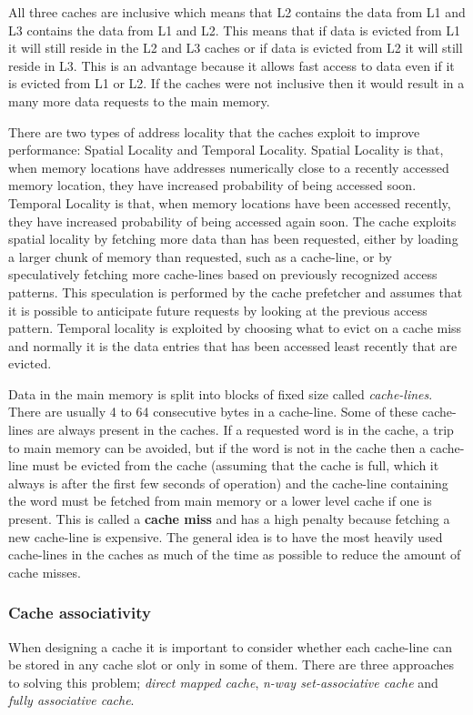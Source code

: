 All three caches are inclusive which means that L2 contains the data from L1 and L3 contains the data from L1 and L2.
This means that if data is evicted from L1 it will still reside in the L2 and L3 caches or if data is evicted from L2 it will still reside in L3. 
This is an advantage because it allows fast access to data even if it is evicted from L1 or L2. 
If the caches were not inclusive then it would result in a many more data requests to the main memory.

There are two types of address locality that the caches exploit to improve performance: Spatial Locality and Temporal Locality.
Spatial Locality is that, when memory locations have addresses numerically close to a recently accessed memory location, they have increased probability of being accessed soon.
Temporal Locality is that, when memory locations have been accessed recently, they have increased probability of being accessed again soon.
The cache exploits spatial locality by fetching more data than has been requested, either by loading a larger chunk of memory than requested, such as a cache-line, or by speculatively fetching more cache-lines based on previously recognized access patterns.  This speculation is performed by the cache prefetcher and assumes that it is possible to anticipate future requests by looking at the previous access pattern.
Temporal locality is exploited by choosing what to evict on a cache miss and normally it is the data entries that has been accessed least recently that are evicted.

Data in the main memory is split into blocks of fixed size called \textit{cache-lines}. 
There are usually 4 to 64 consecutive bytes in a cache-line. 
Some of these cache-lines are always present in the caches. 
If a requested word is in the cache, a trip to main memory can be avoided, but if the word is not in the cache then a cache-line must be evicted from the cache (assuming that the cache is full, which it always is after the first few seconds of operation) and the cache-line containing the word must be fetched from main memory or a lower level cache if one is present. 
This is called a \textbf{cache miss} and has a high penalty because fetching a new cache-line is expensive.
The general idea is to have the most heavily used cache-lines in the caches as much of the time as possible to reduce the amount of cache misses.

\subsubsection{Cache associativity}
When designing a cache it is important to consider whether each cache-line can be stored in any cache slot or only in some of them.
There are three approaches to solving this problem; \textit{direct mapped cache}, \textit{n-way set-associative cache} and \textit{fully associative cache}. 

